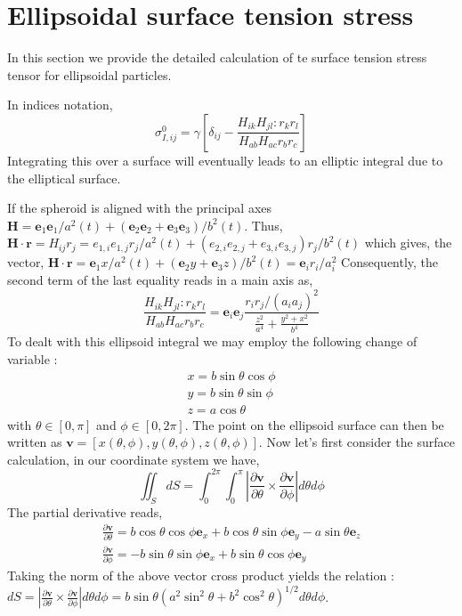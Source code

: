 
\section{Ellipsoidal surface tension stress}
\label{ap:surface_tension}
In this section we provide the detailed calculation of te surface tension stress tensor for ellipsoidal particles. 

In indices notation,  
\begin{equation*}
    \sigma_{I,ij}^0 =\gamma\left[
    \delta_{ij} - \frac{ H_{ik} H_{jl} :  r_kr_l}{  H_{ab}  H_{ac} r_br_c} \right]
\end{equation*}
Integrating this over a surface will eventually leads to an elliptic integral due to the elliptical surface. 

If the spheroid is aligned with the principal axes $\textbf{H} = \textbf{e}_1\textbf{e}_1 / a^2(t) + (\textbf{e}_2\textbf{e}_2+ \textbf{e}_3\textbf{e}_3)/b^2(t)$.
Thus, $\textbf{H}\cdot \textbf{r} = H_{ij} r_j = {e}_{1,i}{e}_{1,j}r_j / a^2(t) + ({e}_{2,i}{e}_{2,j} + {e}_{3,i}{e}_{3,j})r_j/b^2(t) $ which gives, the vector, 
$\textbf{H}\cdot \textbf{r} = \textbf{e}_{1} x/ a^2(t) + (\textbf{e}_{2}y + \textbf{e}_{3}z)/b^2(t)  = \textbf{e}_i r_i /a_i^2$
Consequently, the second term of the last equality reads in a main axis as, 
\begin{equation*}
    \frac{ H_{ik} H_{jl} :  r_kr_l}{  H_{ab}  H_{ac} r_br_c} 
    = \textbf{e}_i \textbf{e}_j \frac{ r_i r_j /(a_i a_j)^2 }
    {\frac{z^2}{a^4}+\frac{y^2+x^2}{b^4}}
\end{equation*}
To dealt with this ellipsoid integral we may employ the following change of variable :
\begin{align*}
    x = b \sin \theta \cos \phi\\
    y = b \sin \theta \sin \phi\\
    z = a \cos \theta 
\end{align*}
with $\theta \in [0,\pi]$ and $\phi \in [0,2\pi]$. 
The point on the ellipsoid surface can then be written as $\textbf{v} = [x(\theta,\phi),y(\theta,\phi),z(\theta,\phi)]$. 
Now let's first consider the surface calculation, in our coordinate system we have, 
\begin{equation*}
    \iint_S dS
    = 
    \int_{0}^{2\pi}
    \int_{0}^{\pi}
    \left|\frac{\partial \textbf{v}}{\partial \theta} 
    \times 
    \frac{\partial \textbf{v}}{\partial \phi} \right|
    d\theta
    d\phi
\end{equation*}
The partial derivative reads, 
\begin{align*}
    \frac{\partial \textbf{v}}{\partial \theta}
    = 
    b \cos \theta \cos \phi \textbf{e}_x
    + b \cos \theta \sin \phi\textbf{e}_y
    - a \sin \theta \textbf{e}_z
    \\
    \frac{\partial \textbf{v}}{\partial \phi}
    = 
    - b \sin \theta \sin \phi \textbf{e}_x
    + b \sin \theta \cos \phi\textbf{e}_y
\end{align*}
Taking the norm of the above vector cross product yields the relation : 
$dS = \left|\frac{\partial \textbf{v}}{\partial \theta} 
\times 
\frac{\partial \textbf{v}}{\partial \phi} \right| d\theta d\phi = b \sin\theta (a^2\sin^2\theta+ b^2 \cos^2\theta)^{1/2}d\theta d\phi$. 

